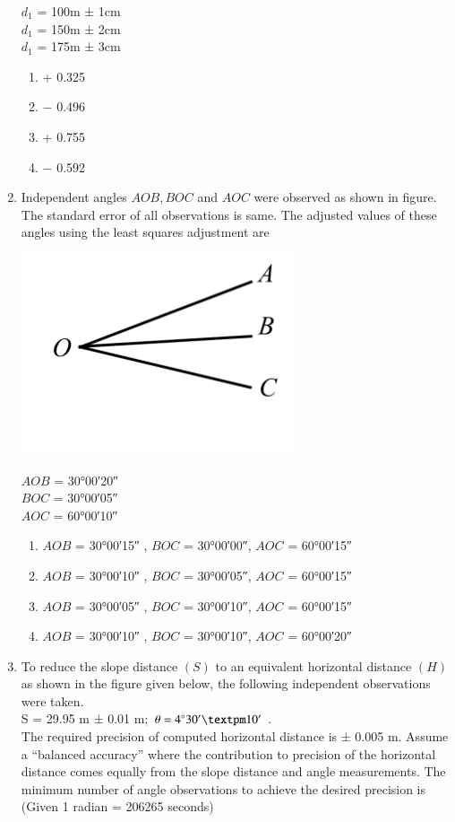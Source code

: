 \documentclass[12pt]{article}
\begin{document}
\begin{enumerate}
  $d_1$ = 100m ± 1cm\\ 
  $d_1$ = 150m ± 2cm \\
  $d_1$ = 175m ± 3cm 

  \begin{enumerate}
    \item + 0.325 
   \item $-$ 0.496 
   \item + 0.755 
   \item $-$ 0.592
  \end{enumerate}

\item Independent angles $AOB, BOC$ and $AOC$ were observed as shown in figure. The
standard error of all observations is same. The adjusted values of these angles
using the least squares adjustment are 

\includegraphics[scale = 0.9]{Figs/LatexImage5.png} 

  $AOB$ = \ang{30;00;20} \\
  $BOC$ = \ang{30;00;05}\\
  $AOC$ = \ang{60;00;10} 

  \begin{enumerate}
    \item $AOB$ = \ang{30;00;15} , $BOC$ = \ang{30;00;00}, $AOC$ = \ang{60;00;15} 
   \item $AOB$ = \ang{30;00;10} , $BOC$ = \ang{30;00;05}, $AOC$ = \ang{60;00;15} 
   \item $AOB$ = \ang{30;00;05} , $BOC$ = \ang{30;00;10}, $AOC$ = \ang{60;00;15} 
   \item $AOB$ = \ang{30;00;10} , $BOC$ = \ang{30;00;10}, $AOC$ = \ang{60;00;20}
  \end{enumerate}

\item To reduce the slope distance $(S)$ to an equivalent horizontal distance $(H)$ as shown in the figure given below, the following independent observations were taken.\\
  S = 29.95 m ± 0.01 m; $\theta = 4\degree 30' ± 10'$ . \\
  The required precision of computed horizontal distance is ± 0.005 m. Assume a “balanced accuracy” where the contribution to precision of the horizontal distance comes equally from the slope distance and angle measurements. The minimum number of angle observations to achieve the desired precision is\\ 
   (Given 1 radian = 206265 seconds) \\


\end{enumerate}
\end{document}
